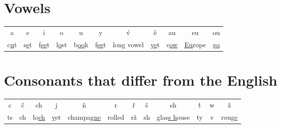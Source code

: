 \section*{Vowels}

\begin{tabular}{ccccccccccc}
a & e & i & o & u & y & \'{v} & \v{e} & au & eu & ou \\
c\underline{u}t & s\underline{e}t & f\underline{ee}t & l\underline{o}st & b\underline{oo}k & f\underline{ee}t & long vowel & \underline{ye}t & c\underline{ow} & \underline{Eu}rope & g\underline{o} \\
\end{tabular}


\section*{Consonants that differ from the English}

\begin{tabular}{cccccccccccc}
c  & \v{c} & ch               & j               & \v{n} & r      & \v{r} & \v{s} & sh & \'{t} & w & \v{z}\\
ts & ch    & lo\underline{ch} & \underline{y}et & champa\underline{gne} & rolled & r\v{z}   & sh    & glas\underline{s h}ouse & ty    & v & rou\underline{ge} \\
\end{tabular}

